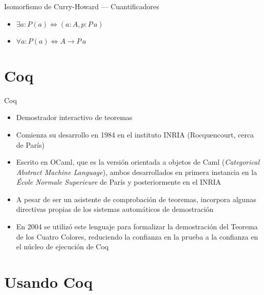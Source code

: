 \documentclass[10pt]{beamer}
\begin{document}
\begin{frame}[fragile]{Isomorfismo de Curry-Howard --- Cuantificadores}

  \begin{itemize}
  \item $\exists a : P(a) \iff (a : A, p : P \, a)$
  \item $\forall a : P(a) \iff A \rightarrow P \, a$
  \end{itemize}

\end{frame}

\section{Coq}

\begin{frame}[fragile]{Coq}

  \begin{itemize}
  \item Demostrador interactivo de teoremas
  \item Comienza su desarrollo en 1984 en el instituto INRIA
    (Rocquencourt, cerca de París)
  \item Escrito en OCaml, que es la versión orientada a objetos de
    Caml (\textit{Categorical Abstract Machine Language}), ambos
    desarrollados en primera instancia en la \textit{École Normale
      Superieure} de París y posteriormente en el INRIA
  \item A pesar de ser un asistente de comprobación de teoremas,
    incorpora algunas directivas propias de los sistemas automáticos
    de demostración
  \item En 2004 se utilizó este lenguaje para formalizar la
    demostración del Teorema de los Cuatro Colores, reduciendo la
    confianza en la prueba a la confianza en el núcleo de ejecución
    de Coq
  \end{itemize}

\end{frame}

\section{Usando Coq}
\end{document}
